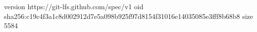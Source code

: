 version https://git-lfs.github.com/spec/v1
oid sha256:c19c4f3a1c8d002912d7e5a098b925f97d8154f31016e14035085e3fff8b68b8
size 5584
